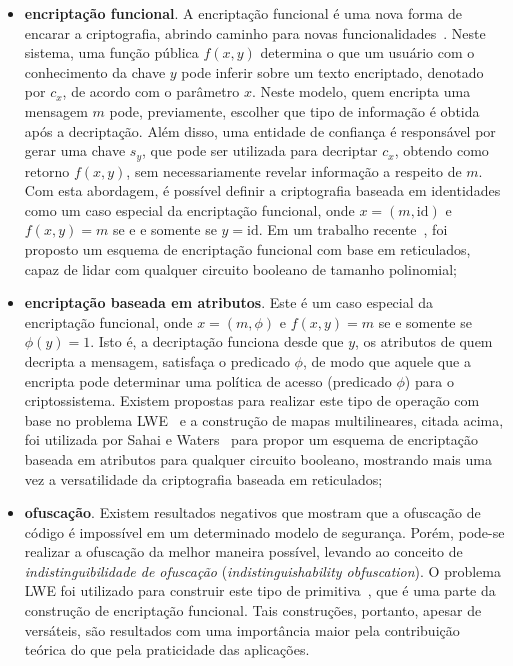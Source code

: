 \documentclass{SBCbookchapter}
\begin{document}
\begin{otherlanguage}{brazilian}
\begin{itemize}
\item \textbf{encriptação funcional}. A encriptação funcional é uma nova forma de encarar a criptografia, abrindo caminho para novas funcionalidades~\cite{fe10}. Neste sistema, uma função pública $f(x,y)$ determina o que um usuário com o conhecimento da chave $y$ pode inferir sobre um texto encriptado, denotado por $c_x$, de acordo com o parâmetro $x$. Neste modelo, quem encripta uma mensagem $m$ pode, previamente, escolher que tipo de informação é obtida após a decriptação. Além disso, uma entidade de confiança é responsável por gerar uma chave $s_y$, que pode ser utilizada para decriptar $c_x$, obtendo como retorno $f(x,y)$, sem necessariamente revelar informação a respeito de $m$. Com esta abordagem, é possível definir a criptografia baseada em identidades como um caso especial da encriptação funcional, onde $x = (m, \mathrm{id})$ e $f(x,y) = m$ se e e somente se $y = \mathrm{id}$. Em um trabalho recente~\cite{funcenc}, foi proposto um esquema de encriptação funcional com base em reticulados, capaz de lidar com qualquer circuito booleano de tamanho polinomial;

\item \textbf{encriptação baseada em atributos}. Este é um caso especial da encriptação funcional, onde $x = (m, \phi)$ e $f(x,y) = m$ se e somente se $\phi(y) = 1$. Isto é, a decriptação funciona desde que $y$, os atributos de quem decripta a mensagem, satisfaça o predicado $\phi$, de modo que aquele que a encripta pode determinar uma política de acesso (predicado $\phi$) para o criptossistema. Existem propostas para realizar este tipo de operação com base no problema LWE~\cite{abeLWE} e a construção de mapas multilineares, citada acima, foi utilizada por Sahai e Waters~\cite{abe} para propor um esquema de encriptação baseada em atributos para qualquer circuito booleano, mostrando mais uma vez a versatilidade da criptografia baseada em reticulados;

\item \textbf{ofuscação}. Existem resultados negativos que mostram que a ofuscação de código é impossível em um determinado modelo de segurança. Porém, pode-se realizar a ofuscação da melhor maneira possível, levando ao conceito de \emph{indistinguibilidade de ofuscação} (\textit{indistinguishability obfuscation}). O problema LWE foi utilizado para construir este tipo de primitiva~\cite{funcenc}, que é uma parte da construção de encriptação funcional. Tais construções, portanto, apesar de versáteis, são resultados com uma importância maior pela contribuição teórica do que pela praticidade das aplicações.
\end{itemize}






\end{otherlanguage}
\end{document}
